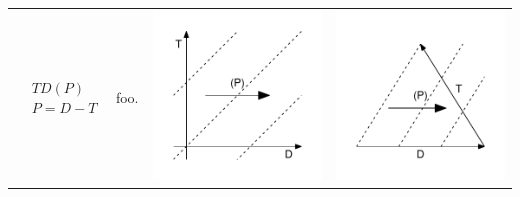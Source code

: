 \documentclass[
  12pt
]{scrartcl}
\begin{document}
\begin{center}
\begin{longtable}{m{}m{}m{}m{}}
  \midrule
  $$\begin{aligned}
    &TD(P) \\
    &P = D - T
  \end{aligned}$$ &
  foo. &
  \includegraphics[width = \linewidth]{../fig/TDp.pdf} &
  \includegraphics[width = \linewidth]{../fig/TDp_iso.pdf}  \\

\end{longtable}
\end{center}
\end{document}
